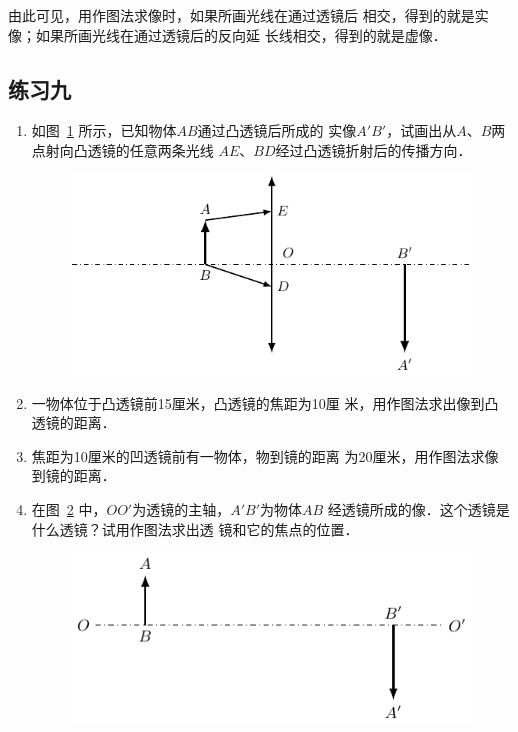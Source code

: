 由此可见，用作图法求像时，如果所画光线在通过透镜后
相交，得到的就是实像；如果所画光线在通过透镜后的反向延
长线相交，得到的就是虚像．


\subsection*{练习九}
\begin{enumerate}
\item 如图~\ref{fig_C_5-45} 所示，已知物体$AB$通过凸透镜后所成的
实像$A'B'$，试画出从$A$、$B$两点射向凸透镜的任意两条光线
$AE$、$BD$经过凸透镜折射后的传播方向．
\begin{figure}[htbp]
    \centering
    \includegraphics{fig/C/5-45.pdf}
    \caption{}\label{fig_C_5-45}
\end{figure}

\item 一物体位于凸透镜前15厘米，凸透镜的焦距为10厘
米，用作图法求出像到凸透镜的距离．
\item 焦距为10厘米的凹透镜前有一物体，物到镜的距离
为20厘米，用作图法求像到镜的距离．
\item 在图~\ref{fig_C_5-46} 中，$OO'$为透镜的主轴，$A'B'$为物体$AB$
经透镜所成的像．这个透镜是什么透镜？试用作图法求出透
镜和它的焦点的位置．                    
\begin{figure}[htbp]
    \centering
    \includegraphics{fig/C/5-46.pdf}
    \caption{}\label{fig_C_5-46}
\end{figure}
\end{enumerate}

